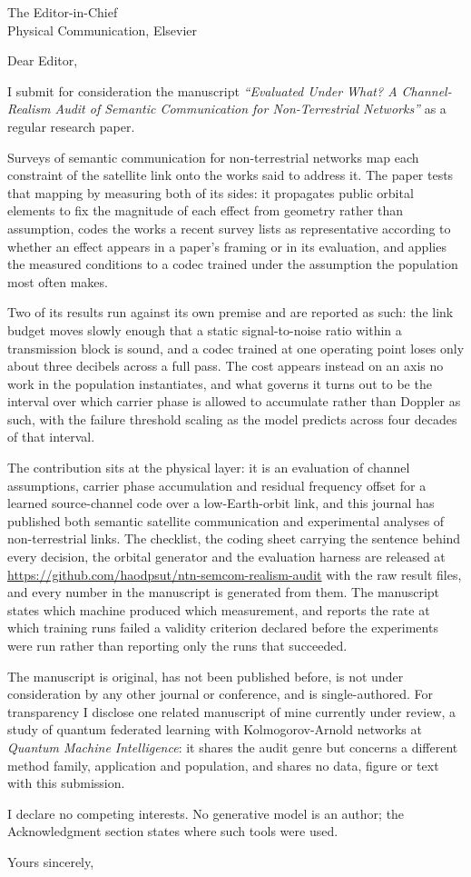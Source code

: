 \documentclass[11pt,a4paper]{letter}
\begin{document}
\begin{letter}{The Editor-in-Chief\\Physical Communication, Elsevier}

\opening{Dear Editor,}

I submit for consideration the manuscript \emph{``Evaluated Under What? A Channel-Realism Audit
of Semantic Communication for Non-Terrestrial Networks''} as a regular research paper.

Surveys of semantic communication for non-terrestrial networks map each constraint of the
satellite link onto the works said to address it. The paper tests that mapping by measuring both
of its sides: it propagates public orbital elements to fix the magnitude of each effect from
geometry rather than assumption, codes the works a recent survey lists as representative
according to whether an effect appears in a paper's framing or in its evaluation, and applies the
measured conditions to a codec trained under the assumption the population most often makes.

Two of its results run against its own premise and are reported as such: the link budget moves
slowly enough that a static signal-to-noise ratio within a transmission block is sound, and a
codec trained at one operating point loses only about three decibels across a full pass. The cost
appears instead on an axis no work in the population instantiates, and what governs it turns out
to be the interval over which carrier phase is allowed to accumulate rather than Doppler as such,
with the failure threshold scaling as the model predicts across four decades of that interval.

The contribution sits at the physical layer: it is an evaluation of channel assumptions,
carrier phase accumulation and residual frequency offset for a learned source-channel code over
a low-Earth-orbit link, and this journal has published both semantic satellite communication and
experimental analyses of non-terrestrial links. The checklist, the coding sheet carrying the sentence
behind every decision, the orbital generator and the evaluation harness are released at
\url{https://github.com/haodpsut/ntn-semcom-realism-audit} with the raw result files, and every
number in the manuscript is generated from them. The manuscript states which machine produced
which measurement, and reports the rate at which training runs failed a validity criterion
declared before the experiments were run rather than reporting only the runs that succeeded.

The manuscript is original, has not been published before, is not under consideration by any
other journal or conference, and is single-authored. For transparency I disclose one related
manuscript of mine currently under review, a study of quantum federated learning with
Kolmogorov-Arnold networks at \emph{Quantum Machine Intelligence}: it shares the audit genre but
concerns a different method family, application and population, and shares no data, figure or
text with this submission.

I declare no competing interests. No generative model is an author; the Acknowledgment section
states where such tools were used.

\closing{Yours sincerely,}
\end{letter}
\end{document}
